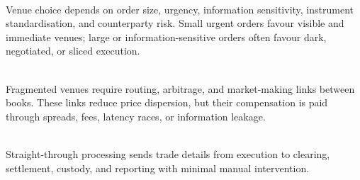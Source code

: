 \begin{practitionernote} \\
Venue choice depends on order size, urgency, information sensitivity, instrument standardisation, and counterparty risk. Small urgent orders favour visible and immediate venues; large or information-sensitive orders often favour dark, negotiated, or sliced execution.
\end{practitionernote}

\begin{mechanism} \\
Fragmented venues require routing, arbitrage, and market-making links between books. These links reduce price dispersion, but their compensation is paid through spreads, fees, latency races, or information leakage.
\end{mechanism}

\begin{practitionernote} \\
Straight-through processing sends trade details from execution to clearing, settlement, custody, and reporting with minimal manual intervention.
\end{practitionernote}
